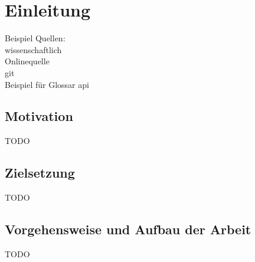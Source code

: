 \chapter{Einleitung}
Beispiel Quellen:
\\
wissenschaftlich \cite{doi:10.1162/neco.1989.1.4.541}
\\
Onlinequelle \cite{LSVRC}
\\
git \cite{chollet2015}
\\
Beispiel für Glossar \gls{api}

\section{Motivation}
TODO

\section{Zielsetzung}
TODO

\section{Vorgehensweise und Aufbau der Arbeit}
TODO